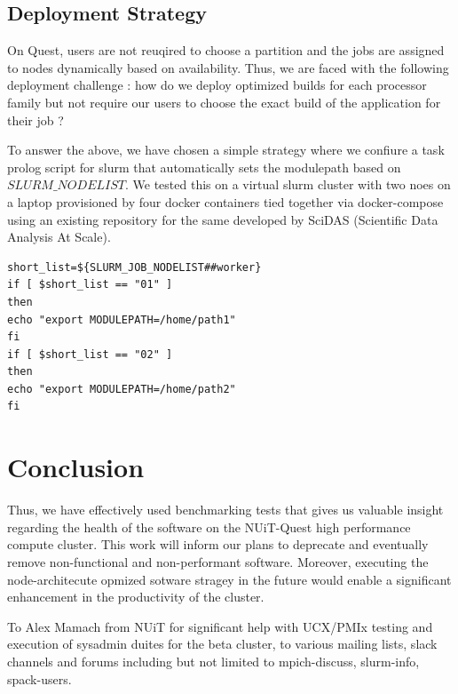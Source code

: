 \documentclass[sigconf,authordraft]{acmart}
\begin{document}
\subsection{Deployment Strategy}
On Quest, users are not reuqired to choose a partition and the jobs are assigned to nodes dynamically based on availability. Thus, we are faced with the following deployment challenge : how do we deploy optimized builds for each processor family but not require our users to choose the exact build of the application for their job ?

To answer the above, we have chosen a simple strategy where we confiure a task prolog script for slurm that automatically sets the modulepath based on $SLURM\_NODELIST$. We tested this on a virtual slurm cluster with two noes on a laptop provisioned by four docker containers tied together via docker-compose using an existing repository \cite{slurmdocker_repository} for the same developed by SciDAS (Scientific Data Analysis At Scale).

\begin{verbatim}
short_list=${SLURM_JOB_NODELIST##worker}
if [ $short_list == "01" ]
then
echo "export MODULEPATH=/home/path1"
fi
if [ $short_list == "02" ]
then
echo "export MODULEPATH=/home/path2"
fi
\end{verbatim}

\section{Conclusion}

Thus, we have effectively used benchmarking tests that gives us valuable insight regarding the health of the software on the NUiT-Quest high performance compute cluster. This work will inform our plans to deprecate and eventually remove non-functional and non-performant software. Moreover, executing the node-architecute opmized sotware stragey in the future would enable a significant enhancement in the productivity of the cluster.

\begin{acks}
To Alex Mamach from NUiT for significant help with UCX/PMIx testing and execution of sysadmin duites for the beta cluster, to various mailing lists, slack channels and forums including but not limited to mpich-discuss, slurm-info, spack-users.
\end{acks}
\end{document}

